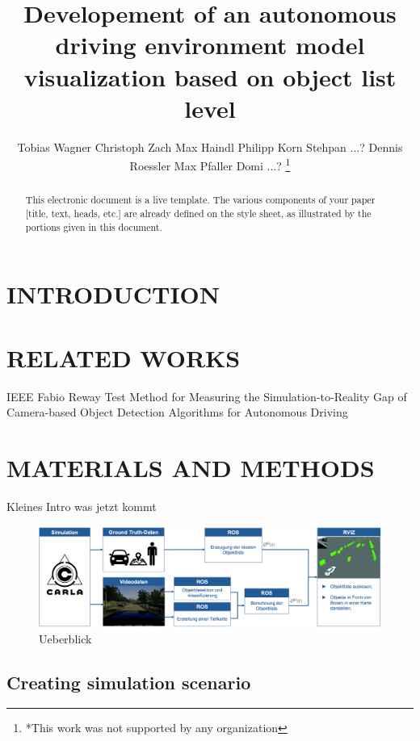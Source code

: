 \documentclass[letterpaper, 10 pt, conference]{ieeeconf}  %
\title{\LARGE \bf
Developement of an autonomous driving environment model visualization based on object list level
}
\author{Tobias Wagner  Christoph Zach Max Haindl Philipp Korn Stehpan ...? Dennis Roessler Max Pfaller Domi ...? %
\thanks{*This work was not supported by any organization}%
}
\begin{document}
\maketitle
\thispagestyle{empty}
\pagestyle{empty}


\begin{abstract}

This electronic document is a live template. The various components of your paper [title, text, heads, etc.] are already defined on the style sheet, as illustrated by the portions given in this document.

\end{abstract}


\section{INTRODUCTION}


\section{RELATED WORKS}

IEEE Fabio Reway Test Method for Measuring the Simulation-to-Reality Gap of Camera-based Object Detection Algorithms for Autonomous Driving


\section{MATERIALS AND METHODS}

Kleines Intro was jetzt kommt


\begin{figure}[thpb]
      \centering
       \includegraphics[scale=0.17]{Ueberblick}
      \caption{Ueberblick }
      \label{figurelabel}
   \end{figure}
\subsection{Creating simulation scenario}
\end{document}
